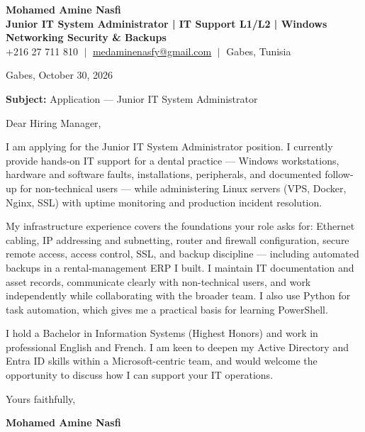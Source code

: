 \documentclass[11pt,a4paper]{article}
\begin{document}
\begin{center}
    \textbf{\Huge \color{navy} Mohamed Amine Nasfi} \\[3pt]
    \small \textbf{\color{accent} Junior IT System Administrator | IT Support L1/L2 | Windows \textperiodcentered{} Networking \textperiodcentered{} Security \& Backups} \\[3pt]
    \footnotesize \color{greytext}
    +216 27 711 810 $\;|\;$
    \href{mailto:medaminenasfy@gmail.com}{\underline{medaminenasfy@gmail.com}} $\;|\;$
    Gabes, Tunisia
\end{center}

\vspace{8pt}
\hfill Gabes, October 30, 2026

\vspace{12pt}


\vspace{10pt}
\textbf{Subject:} Application — Junior IT System Administrator

\vspace{4pt}
Dear Hiring Manager,

I am applying for the Junior IT System Administrator position. I currently provide hands-on IT support for a dental practice — Windows workstations, hardware and software faults, installations, peripherals, and documented follow-up for non-technical users — while administering Linux servers (VPS, Docker, Nginx, SSL) with uptime monitoring and production incident resolution.

My infrastructure experience covers the foundations your role asks for: Ethernet cabling, IP addressing and subnetting, router and firewall configuration, secure remote access, access control, SSL, and backup discipline — including automated backups in a rental-management ERP I built. I maintain IT documentation and asset records, communicate clearly with non-technical users, and work independently while collaborating with the broader team. I also use Python for task automation, which gives me a practical basis for learning PowerShell.

I hold a Bachelor in Information Systems (Highest Honors) and work in professional English and French. I am keen to deepen my Active Directory and Entra ID skills within a Microsoft-centric team, and would welcome the opportunity to discuss how I can support your IT operations.

Yours faithfully,

\vspace{14pt}
\hfill \textbf{Mohamed Amine Nasfi}
\end{document}
